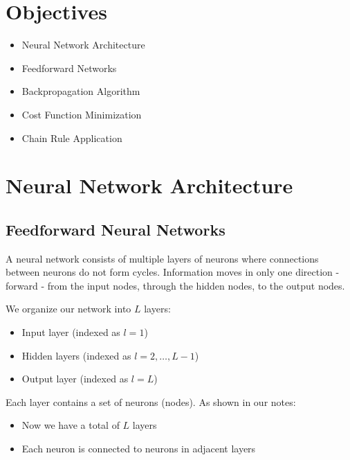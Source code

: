 
\section*{Objectives}
\begin{itemize}
    \item Neural Network Architecture
    \item Feedforward Networks
    \item Backpropagation Algorithm
    \item Cost Function Minimization
    \item Chain Rule Application
\end{itemize}

\section{Neural Network Architecture}

\subsection{Feedforward Neural Networks}
A  neural network consists of multiple layers of neurons where connections between neurons do not form cycles. Information moves in only one direction - forward - from the input nodes, through the hidden nodes, to the output nodes.

We organize our network into $L$ layers:
\begin{itemize}
    \item Input layer (indexed as $l=1$)
    \item Hidden layers (indexed as $l=2, \ldots, L-1$)
    \item Output layer (indexed as $l=L$)
\end{itemize}

Each layer contains a set of neurons (nodes). As shown in our notes:
\begin{itemize}
    \item Now we have a total of $L$ layers
    \item Each neuron is connected to neurons in adjacent layers
\end{itemize}


